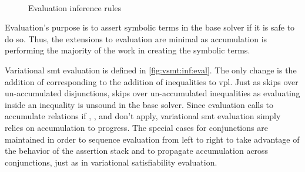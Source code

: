 ~\label{section:vsmt:evaluation}
%
\begin{figure}
  
  \caption{Evaluation inference rules}%
  \label{fig:vsmt:inf:eval}
\end{figure}
%
Evaluation's
purpose is to assert symbolic terms in the base solver if it is safe to do so.
Thus, the extensions to evaluation are minimal as accumulation is performing the
majority of the work in creating the symbolic terms.

Variational \ac{smt} evaluation is defined in \autoref{fig:vsmt:inf:eval}. The
only change is the addition of \evInEq{} corresponding to the addition of
inequalities to \ac{vpl}. Just as \evOr{} skips over un-accumulated
disjunctions, \evInEq{} skips over un-accumulated inequalities as evaluating
inside an inequality is unsound in the base solver. Since evaluation calls
\evAcc{} to accumulate relations if \evAndL, \evAndR, and \evAnd don't apply,
variational \ac{smt} evaluation simply relies on accumulation to progress. The
special cases for conjunctions are maintained in order to sequence evaluation
from left to right to take advantage of the behavior of the assertion stack and
to propagate accumulation across conjunctions, just as in variational
satisfiability evaluation.


